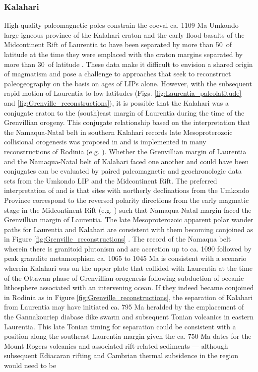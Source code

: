 \documentclass[twocolumn, switch]{article} %
\begin{document}
\subsubsection{Kalahari}

High-quality paleomagnetic poles constrain the coeval ca. 1109 Ma Umkondo large igneous province of the Kalahari craton and the early flood basalts of the Midcontinent Rift of Laurentia to have been separated by more than 50\textdegree\ of latitude at the time they were emplaced with the craton margins separated by more than 30\textdegree\ of latitude \citep{Swanson-Hysell2015a}. These data make it difficult to envision a shared origin of magmatism and pose a challenge to approaches that seek to reconstruct paleogeography on the basis on ages of LIPs alone. However, with the subsequent rapid motion of Laurentia to low latitudes (Figs. \ref{fig:Laurentia_paleolatitude} and \ref{fig:Grenville_reconstructions}), it is possible that the Kalahari was a conjugate craton to the (south)east margin of Laurentia during the time of the Grenvillian orogeny. This conjugate relationship based on the interpretation that the Namaqua-Natal belt in southern Kalahari records late Mesoproterozoic collisional orogenesis was  proposed in \cite{Hoffman1991a} and is implemented in many reconstructions of Rodinia (e.g. \citealp{Li2008a}). Whether the Grenvillian margin of Laurentia and the Namaqua-Natal belt of Kalahari faced one another and could have been conjugates can be evaluated by paired paleomagnetic and geochronologic data sets from the Umkondo LIP and the Midcontinent Rift. The preferred interpretation of \cite{Swanson-Hysell2015a} and \cite{Kasbohm2015a} is that sites with northerly declinations from the Umkondo Province correspond to the reversed polarity directions from the early magmatic stage in the Midcontinent Rift (e.g. \citealp{Swanson-Hysell2014a}) such that Namaqua-Natal margin faced the Grenvillian margin of Laurentia. The late Mesoproterozoic apparent polar wander paths for Laurentia and Kalahari are consistent with them becoming conjoined as in Figure \ref{fig:Grenville_reconstructions} \citep{Swanson-Hysell2015a}. The record of the Namaqua belt wherein there is granitoid plutonism and arc accretion up to ca. 1090 followed by peak granulite metamorphism ca. 1065 to 1045 Ma \citep{Diener2013a, Spencer2015a} is consistent with a scenario wherein Kalahari was on the upper plate that collided with Laurentia at the time of the Ottawan phase of Grenvillian orogenesis following subduction of oceanic lithosphere associated with an intervening ocean. If they indeed became conjoined in Rodinia as in Figure \ref{fig:Grenville_reconstructions}, the separation of Kalahari from Laurentia may have initiated ca. 795 Ma heralded by the emplacement of the Gannakouriep diabase dike swarm \citep{Rioux2010a, DeKock2021a} and subsequent Tonian volcanics in eastern Laurentia. This late Tonian timing for separation could be  consistent with a position along the southeast Laurentia margin given the ca. 750 Ma dates for the Mount Rogers volcanics and associated rift-related sediments \citep{Aleinikoff1995a,MacLennan2020a} --- although subsequent Ediacaran rifting and Cambrian thermal subsidence in the region would need to be 
\end{document}
